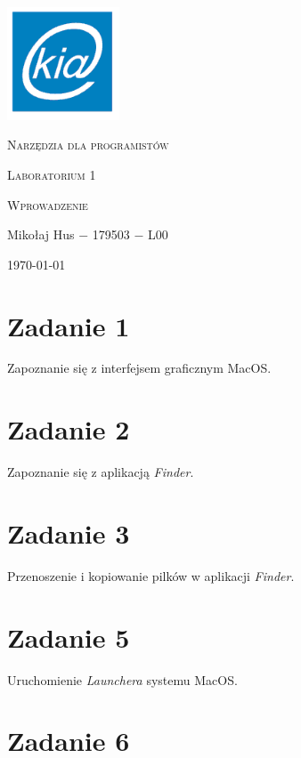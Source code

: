 \documentclass[fleqn,onecolumn,a4paper,12pt,titlepage]{article}
\begin{document}
\begin{titlepage}
    \includegraphics[width=0.25\textwidth]{kai.png}\par\vspace{3cm}
    \centering
    {\LARGE \textsc{Narzędzia dla programistów} \par}
    \vspace{2cm}
    {\Large \textsc{Laboratorium 1} \par} %
    \vspace{2cm}
    {\textsc{Wprowadzenie} \par} %
    \vfill
    Mikołaj Hus $-$ 179503 $-$ L00 \par %
    \vspace{2cm}
    {\large {\today} \par}
\end{titlepage}

\section*{Zadanie 1}

Zapoznanie się z interfejsem graficznym MacOS.

\section*{Zadanie 2}

Zapoznanie się z aplikacją \textit{Finder}.

\section*{Zadanie 3}

Przenoszenie i kopiowanie pilków w aplikacji \textit{Finder}.

\section*{Zadanie 5}

Uruchomienie \textit{Launchera} systemu MacOS.

\section*{Zadanie 6}
\end{document}

